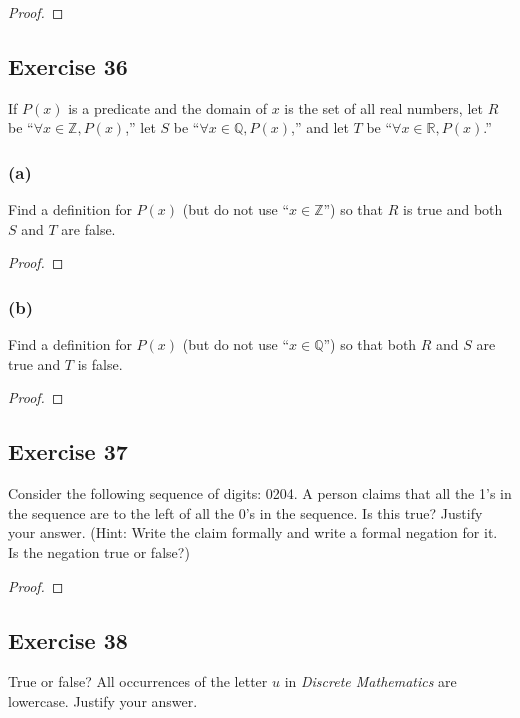\documentclass[14pt]{extarticle}
\newcommand{\R}{\mathbb{R}}
\newcommand{\Z}{\mathbb{Z}}
\newcommand{\Q}{\mathbb{Q}}
\newcommand{\fa}{\forall}
\begin{document}
\begin{proof}

\end{proof}

\subsection{Exercise 36}
If $P(x)$ is a predicate and the domain of $x$ is the set of all real numbers, let $R$ be “$\fa x \in \Z, P(x)$,” let $S$ be “$\fa x \in \Q, P(x)$,” and let $T$ be “$\fa x \in \R, P(x)$.”

\subsubsection{(a)}
Find a definition for $P(x)$ (but do not use “$x \in \Z$”) so that $R$ is true and both $S$ and $T$ are false.

\begin{proof}

\end{proof}

\subsubsection{(b)}
Find a definition for $P(x)$ (but do not use “$x \in \Q$”) so that both $R$ and $S$ are true and $T$ is false.

\begin{proof}

\end{proof}

\subsection{Exercise 37}
Consider the following sequence of digits: 0204. A person claims that all the 1’s in the sequence are to the left of all the 0’s in the sequence. Is this true? Justify your answer. (Hint: Write the claim formally and write a formal negation for it. Is the negation true or false?)

\begin{proof}

\end{proof}

\subsection{Exercise 38}
True or false? All occurrences of the letter $u$ in {\it Discrete Mathematics} are lowercase. Justify your answer.
\end{document}
